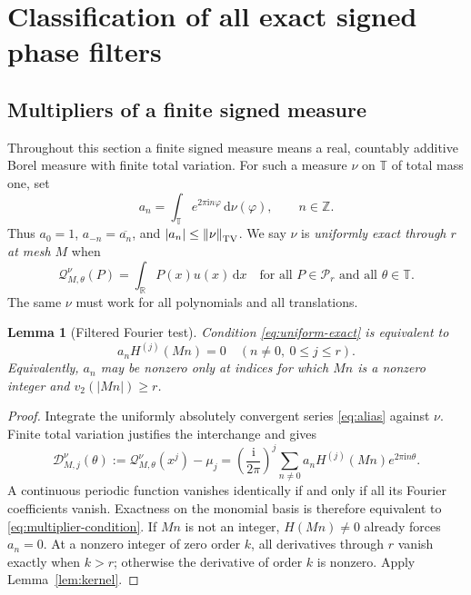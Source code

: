 \documentclass[11pt,a4paper]{article}
\numberwithin{equation}{section}
\newtheorem{lemma}[theorem]{Lemma}
\theoremstyle{definition}
\theoremstyle{remark}
\newcommand{\R}{\mathbb R}\newcommand{\Z}{\mathbb Z}\newcommand{\N}{\mathbb N}
\newcommand{\T}{\mathbb T}\newcommand{\C}{\mathbb C}
\newcommand{\dd}{\,\mathrm d}\newcommand{\ii}{\mathrm i}
\newcommand{\Pol}{\mathcal P}\newcommand{\norm}[1]{\left\lVert#1\right\rVert}
\newcommand{\Q}{\mathcal Q}\newcommand{\Def}{\mathcal D}
\begin{document}
\section{Classification of all exact signed phase filters}

\subsection{Multipliers of a finite signed measure}

Throughout this section a finite signed measure means a real, countably
additive Borel measure with finite total variation. For such a measure
$\nu$ on $\T$ of total mass one, set
\begin{equation}
 a_n=\int_\T e^{2\pi\ii n\varphi}\dd\nu(\varphi),\qquad n\in\Z.
 \label{eq:multipliers}
\end{equation}
Thus $a_0=1$, $a_{-n}=\overline{a_n}$, and
$|a_n|\le\norm{\nu}_{\TV}$. We say $\nu$ is \emph{uniformly exact through
$r$ at mesh $M$} when
\begin{equation}
 \Q^\nu_{M,\theta}(P)=\int_\R P(x)u(x)\dd x
 \quad\text{for all }P\in\Pol_r\text{ and all }\theta\in\T.
 \label{eq:uniform-exact}
\end{equation}
The same $\nu$ must work for all polynomials and all translations.

\begin{lemma}[Filtered Fourier test]
\label{lem:filtered-test}
Condition \eqref{eq:uniform-exact} is equivalent to
\begin{equation}
 a_n H^{(j)}(Mn)=0
 \quad (n\ne0,\ 0\le j\le r).
 \label{eq:multiplier-condition}
\end{equation}
Equivalently, $a_n$ may be nonzero only at indices for which $Mn$ is a
nonzero integer and $v_2(|Mn|)\ge r$.
\end{lemma}
\begin{proof}
Integrate the uniformly absolutely convergent series \eqref{eq:alias}
against $\nu$. Finite total variation justifies the interchange and gives
\begin{equation}
 \Def^\nu_{M,j}(\theta)
 :=\Q^\nu_{M,\theta}(x^j)-\mu_j
 =\left(\frac{\ii}{2\pi}\right)^j
 \sum_{n\ne0}a_nH^{(j)}(Mn)e^{2\pi\ii n\theta}.
 \label{eq:filtered-alias}
\end{equation}
A continuous periodic function vanishes identically if and only if all
its Fourier coefficients vanish. Exactness on the monomial basis is
therefore equivalent to \eqref{eq:multiplier-condition}. If $Mn$ is not an
integer, $H(Mn)\ne0$ already forces $a_n=0$. At a nonzero integer of
zero order $k$, all derivatives through $r$ vanish exactly when $k>r$;
otherwise the derivative of order $k$ is nonzero. Apply
Lemma~\ref{lem:kernel}.
\end{proof}
\end{document}
